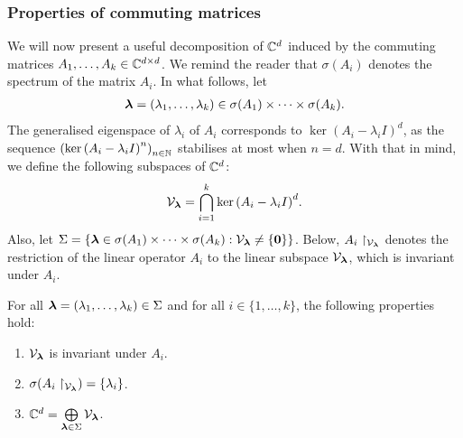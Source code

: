 \subsubsection{Properties of commuting matrices}

We will now present a useful decomposition of $\mathbb{C}^{d}$ induced by the commuting matrices $A_{1}, \ldots, A_{k} \in \mathbb{C}^{d \times d}$. We remind the reader that $\sigma(A_{i})$ denotes the spectrum of the matrix $A_{i}$. In what follows, let
\begin{align*}
\boldsymbol{\lambda} = (\lambda_{1}, \ldots, \lambda_{k}) \in \sigma(A_{1}) \times \cdots \times \sigma(A_{k}) .
\end{align*}
The generalised eigenspace of $\lambda_{i}$ of $A_{i}$ corresponds to $\ker{(A_{i} - \lambda_{i} I)}^{d}$, as the sequence ${(\ker{(A_{i} - \lambda_{i} I)}^{n})}_{n \in \mathbb{N}}$ stabilises at most when $n=d$. With that in mind, we define the following subspaces of $\mathbb{C}^{d}$:
\begin{align*}
\mathcal{V}_{\boldsymbol{\lambda}} = \bigcap \limits_{i=1}^{k} \ker{(A_{i} - \lambda_{i} I)}^{d}.
\end{align*}
Also, let $\Sigma = \lbrace \boldsymbol{\lambda} \in \sigma(A_{1}) \times \cdots \times \sigma(A_{k}) : \mathcal{V}_{\boldsymbol{\lambda}} \neq \lbrace \boldsymbol{0} \rbrace \rbrace$.
Below, $A_{i} \restriction_{\mathcal{V}_{\boldsymbol{\lambda}}}$ denotes the restriction of the linear operator $A_{i}$ to the linear subspace $\mathcal{V}_{\boldsymbol{\lambda}}$, which is invariant under $A_{i}$.

\begin{theorem}
\label{subspace_decomposition}
For all $\boldsymbol{\lambda} = (\lambda_{1}, \ldots, \lambda_{k}) \in \Sigma$ and for all $i \in \lbrace 1, \ldots, k \rbrace$, the following properties hold:

\begin{enumerate}

\item $\mathcal{V}_{\boldsymbol{\lambda}}$ is invariant under $A_{i}$.

\item $\sigma(A_{i} \restriction_{\mathcal{V}_{\boldsymbol{\lambda}}}) = \lbrace \lambda_{i} \rbrace$.

\item $\mathbb{C}^{d} = \bigoplus \limits_{\boldsymbol{\lambda} \in \Sigma} \mathcal{V}_{\boldsymbol{\lambda}}$.

\end{enumerate}
\end{theorem}

